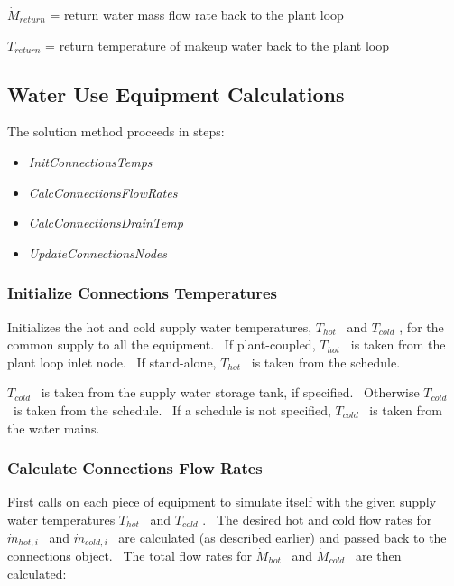 \({\dot M_{return}}\) = return water mass flow rate back to the plant loop

\({T_{return}}\) = return temperature of makeup water back to the plant loop

\subsection{Water Use Equipment Calculations}\label{water-use-equipment-calculations}

The solution method proceeds in steps:

\begin{itemize}
\item
  \emph{InitConnectionsTemps}
\item
  \emph{CalcConnectionsFlowRates}
\item
  \emph{CalcConnectionsDrainTemp}
\item
  \emph{UpdateConnectionsNodes}
\end{itemize}

\subsubsection{Initialize Connections Temperatures}\label{initialize-connections-temperatures}

Initializes the hot and cold supply water temperatures, \({T_{hot}}\) ~and \({T_{cold}}\) , for the common supply to all the equipment.~ If plant-coupled, \({T_{hot}}\) ~is taken from the plant loop inlet node.~ If stand-alone, \({T_{hot}}\) ~is taken from the schedule.

\({T_{cold}}\) ~is taken from the supply water storage tank, if specified.~ Otherwise \({T_{cold}}\) ~is taken from the schedule.~ If a schedule is not specified, \({T_{cold}}\) ~is taken from the water mains.

\subsubsection{Calculate Connections Flow Rates}\label{calculate-connections-flow-rates}

First calls on each piece of equipment to simulate itself with the given supply water temperatures \({T_{hot}}\) ~and \({T_{cold}}\) .~ The desired hot and cold flow rates for \({\dot m_{hot,i}}\) ~and \({\dot m_{cold,i}}\) ~are calculated (as described earlier) and passed back to the connections object.~ The total flow rates for \({\dot M_{hot}}\) ~and \({\dot M_{cold}}\) ~are then calculated:


